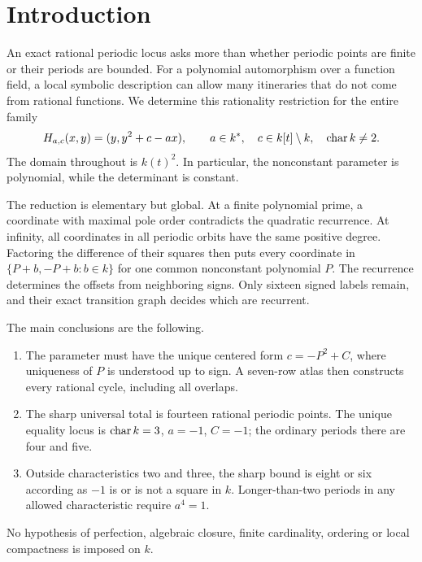 \section{Introduction}
An exact rational periodic locus asks more than whether periodic points
are finite or their periods are bounded. For a polynomial automorphism
over a function field, a local symbolic description can allow many
itineraries that do not come from rational functions. We determine this
rationality restriction for the entire family
\begin{equation}\label{eq:map}
 H_{a,c}(x,y)=(y,y^2+c-a x),\qquad
 a\in k^*,\quad c\in k[t]\setminus k,\quad \operatorname{char} k\ne2.
\end{equation}
The domain throughout is $k(t)^2$. In particular, the nonconstant
parameter is polynomial, while the determinant is constant.

The reduction is elementary but global. At a finite polynomial prime,
a coordinate with maximal pole order contradicts the quadratic
recurrence. At infinity, all coordinates in all periodic orbits have
the same positive degree. Factoring the difference of their squares
then puts every coordinate in $\{P+b,-P+b:b\in k\}$ for one common
nonconstant polynomial $P$. The recurrence determines the offsets from
neighboring signs. Only sixteen signed labels remain, and their exact
transition graph decides which are recurrent.

The main conclusions are the following.
\begin{enumerate}
\item The parameter must have the unique centered form $c=-P^2+C$,
where uniqueness of $P$ is understood up to sign. A seven-row atlas
then constructs every rational cycle, including all overlaps.
\item The sharp universal total is fourteen rational periodic points.
The unique equality locus is $\operatorname{char} k=3$, $a=-1$, $C=-1$; the
ordinary periods there are four and five.
\item Outside characteristics two and three, the sharp bound is eight
or six according as $-1$ is or is not a square in $k$. Longer-than-two
periods in any allowed characteristic require $a^4=1$.
\end{enumerate}
No hypothesis of perfection, algebraic closure, finite cardinality,
ordering or local compactness is imposed on $k$.

